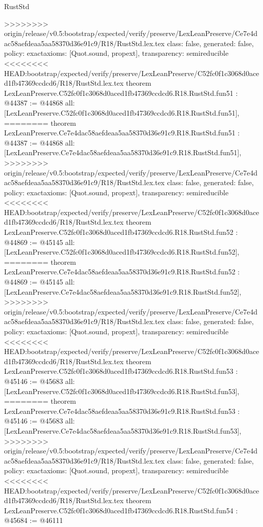 \begin{lexlean}{RustStd}
\begin{coremodule}
{\begin{coremodule}
{{{{{{{{{{{{{{{{{{{{{{{{{{{{{{{{{{{{{{{{{{{{{{{{{{{{{{>>>>>>>> origin/release/v0.5:bootstrap/expected/verify/preserve/LexLeanPreserve/Ce7e4dac58aefdeaa5aa58370d36e91c9/R18/RustStd.lex.tex
  class: false,
  generated: false,
  policy: exact{axioms: [Quot.sound, propext]},
  transparency: semireducible
}
<<<<<<<< HEAD:bootstrap/expected/verify/preserve/LexLeanPreserve/C52fc0f1c3068d0aced1fb47369ccdcd6/R18/RustStd.lex.tex
theorem LexLeanPreserve.C52fc0f1c3068d0aced1fb47369ccdcd6.R18.RustStd.fun51 : @44387 := @44868 {
  all: [LexLeanPreserve.C52fc0f1c3068d0aced1fb47369ccdcd6.R18.RustStd.fun51],
========
theorem LexLeanPreserve.Ce7e4dac58aefdeaa5aa58370d36e91c9.R18.RustStd.fun51 : @44387 := @44868 {
  all: [LexLeanPreserve.Ce7e4dac58aefdeaa5aa58370d36e91c9.R18.RustStd.fun51],
>>>>>>>> origin/release/v0.5:bootstrap/expected/verify/preserve/LexLeanPreserve/Ce7e4dac58aefdeaa5aa58370d36e91c9/R18/RustStd.lex.tex
  class: false,
  generated: false,
  policy: exact{axioms: [Quot.sound, propext]},
  transparency: semireducible
}
<<<<<<<< HEAD:bootstrap/expected/verify/preserve/LexLeanPreserve/C52fc0f1c3068d0aced1fb47369ccdcd6/R18/RustStd.lex.tex
theorem LexLeanPreserve.C52fc0f1c3068d0aced1fb47369ccdcd6.R18.RustStd.fun52 : @44869 := @45145 {
  all: [LexLeanPreserve.C52fc0f1c3068d0aced1fb47369ccdcd6.R18.RustStd.fun52],
========
theorem LexLeanPreserve.Ce7e4dac58aefdeaa5aa58370d36e91c9.R18.RustStd.fun52 : @44869 := @45145 {
  all: [LexLeanPreserve.Ce7e4dac58aefdeaa5aa58370d36e91c9.R18.RustStd.fun52],
>>>>>>>> origin/release/v0.5:bootstrap/expected/verify/preserve/LexLeanPreserve/Ce7e4dac58aefdeaa5aa58370d36e91c9/R18/RustStd.lex.tex
  class: false,
  generated: false,
  policy: exact{axioms: [Quot.sound, propext]},
  transparency: semireducible
}
<<<<<<<< HEAD:bootstrap/expected/verify/preserve/LexLeanPreserve/C52fc0f1c3068d0aced1fb47369ccdcd6/R18/RustStd.lex.tex
theorem LexLeanPreserve.C52fc0f1c3068d0aced1fb47369ccdcd6.R18.RustStd.fun53 : @45146 := @45683 {
  all: [LexLeanPreserve.C52fc0f1c3068d0aced1fb47369ccdcd6.R18.RustStd.fun53],
========
theorem LexLeanPreserve.Ce7e4dac58aefdeaa5aa58370d36e91c9.R18.RustStd.fun53 : @45146 := @45683 {
  all: [LexLeanPreserve.Ce7e4dac58aefdeaa5aa58370d36e91c9.R18.RustStd.fun53],
>>>>>>>> origin/release/v0.5:bootstrap/expected/verify/preserve/LexLeanPreserve/Ce7e4dac58aefdeaa5aa58370d36e91c9/R18/RustStd.lex.tex
  class: false,
  generated: false,
  policy: exact{axioms: [Quot.sound, propext]},
  transparency: semireducible
}
<<<<<<<< HEAD:bootstrap/expected/verify/preserve/LexLeanPreserve/C52fc0f1c3068d0aced1fb47369ccdcd6/R18/RustStd.lex.tex
theorem LexLeanPreserve.C52fc0f1c3068d0aced1fb47369ccdcd6.R18.RustStd.fun54 : @45684 := @46111 {
}}}}}}}}}}}}}}}}}}}}}}}}}}}}}}}}}}}}}}}}}}}}}}}}}}}}}}}}}
\end{coremodule}}
\end{coremodule}
\end{lexlean}
